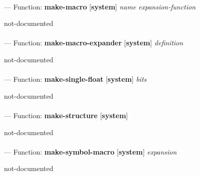 \paragraph{}
\label{SYSTEM:MAKE-MACRO}
--- Function: \textbf{make-macro} [\textbf{system}] \textit{name expansion-function}

\begin{adjustwidth}{5em}{5em}
not-documented
\end{adjustwidth}

\paragraph{}
\label{SYSTEM:MAKE-MACRO-EXPANDER}
--- Function: \textbf{make-macro-expander} [\textbf{system}] \textit{definition}

\begin{adjustwidth}{5em}{5em}
not-documented
\end{adjustwidth}

\paragraph{}
\label{SYSTEM:MAKE-SINGLE-FLOAT}
--- Function: \textbf{make-single-float} [\textbf{system}] \textit{bits}

\begin{adjustwidth}{5em}{5em}
not-documented
\end{adjustwidth}

\paragraph{}
\label{SYSTEM:MAKE-STRUCTURE}
--- Function: \textbf{make-structure} [\textbf{system}] \textit{}

\begin{adjustwidth}{5em}{5em}
not-documented
\end{adjustwidth}

\paragraph{}
\label{SYSTEM:MAKE-SYMBOL-MACRO}
--- Function: \textbf{make-symbol-macro} [\textbf{system}] \textit{expansion}

\begin{adjustwidth}{5em}{5em}
not-documented
\end{adjustwidth}

